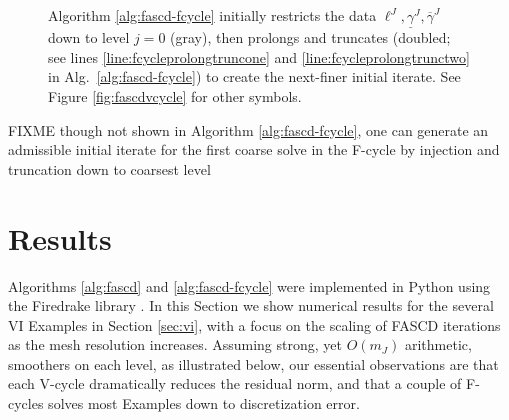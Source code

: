 \documentclass[letterpaper,final,12pt,reqno]{amsart}
\theoremstyle{cstyle}
\theoremstyle{cstyle*}
\theoremstyle{dstyle}
\numberwithin{equation}{section}
\numberwithin{figure}{section}
\numberwithin{table}{section}
\numberwithin{theorem}{section}
\begin{document}
\begin{figure}[ht]
\begin{center}

\end{center}
\caption{Algorithm \ref{alg:fascd-fcycle} initially restricts the data $\ell^J,\underline{\gamma}^J,\overline{\gamma}^J$ down to level $j=0$ (gray), then prolongs and truncates (doubled; see lines \ref{line:fcycleprolongtruncone} and \ref{line:fcycleprolongtrunctwo} in Alg.~\ref{alg:fascd-fcycle}) to create the next-finer initial iterate.  See Figure \ref{fig:fascdvcycle} for other symbols.}
\label{fig:fcycle}
\end{figure}

FIXME though not shown in Algorithm \ref{alg:fascd-fcycle}, one can generate an admissible initial iterate for the first coarse solve in the F-cycle by injection and truncation down to coarsest level


\section{Results} \label{sec:results}

Algorithms \ref{alg:fascd} and \ref{alg:fascd-fcycle} were implemented in Python using the Firedrake library \cite{Rathgeberetal2016}.  In this Section we show numerical results for the several VI Examples in Section \ref{sec:vi}, with a focus on the scaling of FASCD iterations as the mesh resolution increases.  Assuming strong, yet $O(m_J)$ arithmetic, smoothers on each level, as illustrated below, our essential observations are that each V-cycle dramatically reduces the residual norm, and that a couple of F-cycles solves most Examples down to discretization error.
\end{document}
